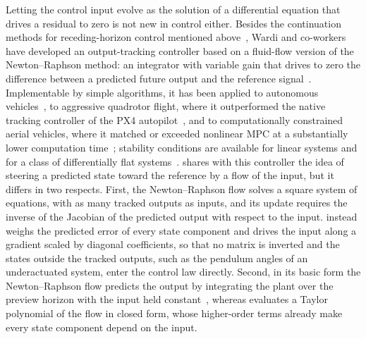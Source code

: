 Letting the control input evolve as the solution of a differential equation that drives a
residual to zero is not new in control either.
Besides the continuation methods for receding-horizon control mentioned
above~\citep{ohtsuka2004continuation}, Wardi and co-workers have developed an output-tracking
controller based on a fluid-flow version of the Newton--Raphson method: an integrator with variable
gain that drives to zero the difference between a predicted future output and the reference
signal~\citep{wardi2017performance,wardi2024tracking}.
Implementable by simple algorithms, it has been applied to autonomous
vehicles~\citep{shivam2019tracking}, to aggressive quadrotor flight, where it outperformed the native
tracking controller of the PX4 autopilot~\citep{morales2024newton}, and to computationally
constrained aerial vehicles, where it matched or exceeded nonlinear MPC at a substantially lower
computation time~\citep{morales2026lightweight}; stability conditions are available for linear
systems and for a class of differentially flat systems~\citep{wardi2024tracking,niu2025stability}.
\method{} shares with this controller the idea of steering a predicted state toward the reference by
a flow of the input, but it differs in two respects.
First, the Newton--Raphson flow solves a square system of equations, with as many tracked outputs as
inputs, and its update requires the inverse of the Jacobian of the predicted output with respect to
the input.
\method{} instead weighs the predicted error of every state component and drives the input along a
gradient scaled by diagonal coefficients, so that no matrix is inverted and the states outside the
tracked outputs, such as the pendulum angles of an underactuated system, enter the control law
directly.
Second, in its basic form the Newton--Raphson flow predicts the output by integrating the plant over
the preview horizon with the input held constant~\citep{wardi2024tracking}, whereas \method{}
evaluates a Taylor polynomial of the flow in closed form, whose higher-order terms already make every
state component depend on the input.

